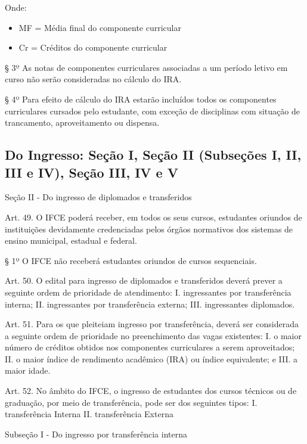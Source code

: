 \documentclass{paper}
\begin{document}
Onde:

\begin{itemize}
\item MF = Média final do componente curricular
\item Cr = Créditos do componente curricular
\end{itemize}

§ 3º As notas de componentes curriculares associadas a um período letivo em curso não serão consideradas no cálculo do IRA.

§ 4º Para efeito de cálculo do IRA estarão incluídos todos os componentes curriculares cursados pelo estudante, com exceção de disciplinas com situação de trancamento, aproveitamento ou dispensa.

\subsection{Do Ingresso: Seção I, Seção II (Subseções I, II, III e IV), Seção III, IV e V}
\label{anexoRODtransferencia}

\begin{center}
Seção II - Do ingresso de diplomados e transferidos
\end{center}

Art. 49. O IFCE poderá receber, em todos os seus cursos, estudantes oriundos de instituições devidamente credenciadas pelos órgãos normativos dos sistemas de ensino municipal, estadual e federal.

§ 1º O IFCE não receberá estudantes oriundos de cursos sequenciais.

Art. 50. O edital para ingresso de diplomados e transferidos deverá prever a seguinte ordem de prioridade de atendimento:
I. ingressantes por transferência interna;
II. ingressantes por transferência externa;
III. ingressantes diplomados.

Art. 51. Para os que pleiteiam ingresso por transferência, deverá ser considerada a seguinte ordem de prioridade no preenchimento das vagas existentes:
I. o maior número de créditos obtidos nos componentes curriculares a serem aproveitados;
II. o maior índice de rendimento acadêmico (IRA) ou índice equivalente; e
III. a maior idade.

Art. 52. No âmbito do IFCE, o ingresso de estudantes dos cursos técnicos ou de graduação, por meio de transferência, pode ser dos seguintes tipos:
I. transferência Interna
II. transferência Externa

\begin{center}
Subseção I - Do ingresso por transferência interna
\end{center}
\end{document}
